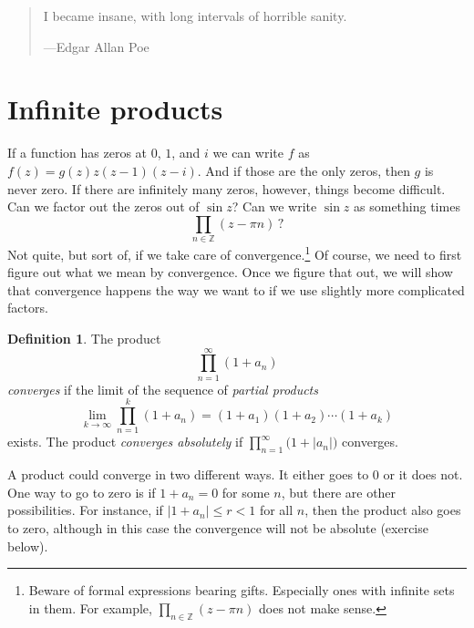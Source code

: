 \documentclass[12pt,openany]{book}
\newcommand{\sabs}[1]{\lvert {#1} \rvert}
\newcommand{\Z}{{\mathbb{Z}}}
\newcommand{\myindex}[1]{#1\index{#1}}
\theoremstyle{plain}
\theoremstyle{remark}
\theoremstyle{definition}
\newtheorem{defn}[thm]{Definition}
\newenvironment{myepigraph}{%
    \begin{quote}%
    \begingroup\itshape
}{%
    \endgroup%
    \end{quote}
}
\theoremstyle{exercise}
\theoremstyle{example}
\begin{document}
\begin{myepigraph}
I became insane, with long intervals of horrible sanity.

---Edgar Allan Poe
\end{myepigraph}


\section{Infinite products}
\label{sec:prod}

If a
function has zeros at $0$, $1$, and $i$ we
can write $f$ as
$f(z) = g(z) z(z-1)(z-i)$.  And if those are the only zeros, then 
$g$ is never zero.  If there are infinitely many zeros, however,
things become difficult.
Can we factor out the zeros out of $\sin z$?  Can we
write $\sin z$ as something times
\begin{equation*}
\prod_{n \in \Z} (z-\pi n) \, ?
\end{equation*}
Not quite, but sort of, if
we take care of convergence.\footnote{Beware of
formal expressions bearing gifts.
Especially ones with infinite sets in them.
For example, $\prod_{n \in \Z} (z-\pi n)$ does not make sense.}
Of course, we need to first
figure out what we mean by convergence.  Once we figure that out,
we will show that convergence happens the way we want to
if we use slightly more complicated factors.

\begin{defn}
The product
%
\begin{equation*}
\prod_{n=1}^\infty (1+a_n)
\end{equation*}
\emph{converges} if the limit of the
sequence of \emph{\myindex{partial products}}
\begin{equation*}
\lim_{k\to \infty}
\prod_{n=1}^k (1+a_n) = (1+a_1)(1+a_2) \cdots (1+a_k)
\end{equation*}
exists.
The product
\emph{converges absolutely}
if $\prod_{n=1}^\infty \bigl(1+\sabs{a_n}\bigr)$
converges.
\end{defn}

A product could converge in two different ways.  It either goes to $0$ or it
does not.
One way to go to zero is if $1+a_n=0$ for some $n$, but there
are other possibilities.  For instance, if $\sabs{1+a_n} \leq r < 1$ for all
$n$, then the product also goes to zero, although in this case the
convergence will not be absolute (exercise below).
\end{document}
